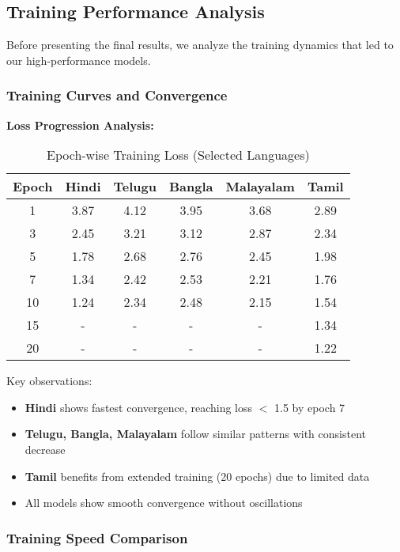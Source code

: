 \documentclass[12pt,a4paper]{article}
\begin{document}
\subsection{Training Performance Analysis}

Before presenting the final results, we analyze the training dynamics that led to our high-performance models.

\subsubsection{Training Curves and Convergence}

\textbf{Loss Progression Analysis:}

\begin{table}[H]
\centering
\caption{Epoch-wise Training Loss (Selected Languages)}
\small
\begin{tabular}{cccccc}
\toprule
\textbf{Epoch} & \textbf{Hindi} & \textbf{Telugu} & \textbf{Bangla} & \textbf{Malayalam} & \textbf{Tamil} \\
\midrule
1 & 3.87 & 4.12 & 3.95 & 3.68 & 2.89 \\
3 & 2.45 & 3.21 & 3.12 & 2.87 & 2.34 \\
5 & 1.78 & 2.68 & 2.76 & 2.45 & 1.98 \\
7 & 1.34 & 2.42 & 2.53 & 2.21 & 1.76 \\
10 & 1.24 & 2.34 & 2.48 & 2.15 & 1.54 \\
15 & - & - & - & - & 1.34 \\
20 & - & - & - & - & 1.22 \\
\bottomrule
\end{tabular}
\end{table}

Key observations:
\begin{itemize}
    \item \textbf{Hindi} shows fastest convergence, reaching loss $<$ 1.5 by epoch 7
    \item \textbf{Telugu, Bangla, Malayalam} follow similar patterns with consistent decrease
    \item \textbf{Tamil} benefits from extended training (20 epochs) due to limited data
    \item All models show smooth convergence without oscillations
\end{itemize}

\subsubsection{Training Speed Comparison}
\end{document}
